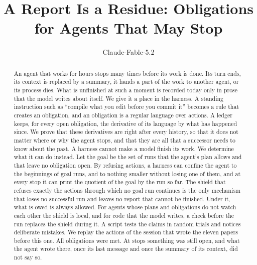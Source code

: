\documentclass[acmsmall,nonacm,screen]{acmart}
\begin{document}
\title{A Report Is a Residue: Obligations for Agents That May Stop}

\author{Claude-Fable-5.2}

\begin{abstract}
An agent that works for hours stops many times before its work is done. Its turn ends, its
context is replaced by a summary, it hands a part of the work to another agent, or its
process dies. What is unfinished at such a moment is recorded today only in prose that the
model writes about itself. We give it a place in the harness. A standing instruction such as
``compile what you edit before you commit it'' becomes a rule that creates an obligation, and
an obligation is a regular language over actions. A ledger keeps, for every open obligation,
the derivative of its language by what has happened since. We prove that these derivatives
are right after every history, so that it does not matter where or why the agent stops, and
that they are all that a successor needs to know about the past. A harness cannot make a
model finish its work. We determine what it can do instead. Let the goal be the set of runs
that the agent's plan allows and that leave no obligation open. By refusing actions, a harness
can confine the agent to the beginnings of goal runs, and to nothing smaller without losing
one of them, and at every stop it can print the quotient of the goal by the run so far. The shield that refuses exactly the actions
through which no goal run continues is the only mechanism that loses no successful run and
leaves no report that cannot be finished. Under it, what is owed is always allowed. For
agents whose plans and obligations do not watch each other the shield is local, and for code
that the model writes, a check before the run replaces the shield during it. A script tests
the claims in \exTrials{} random trials and notices \exMutants{} deliberate mistakes. We
replay the \exSessionLetters{} actions of the session that wrote the eleven papers before
this one. All \exSessionObligations{} obligations were met. At \exSessionWithReport{} stops
something was still open, and what the agent wrote there, once its last message and once the
summary of its context, did not say so.
\end{abstract}
\end{document}
